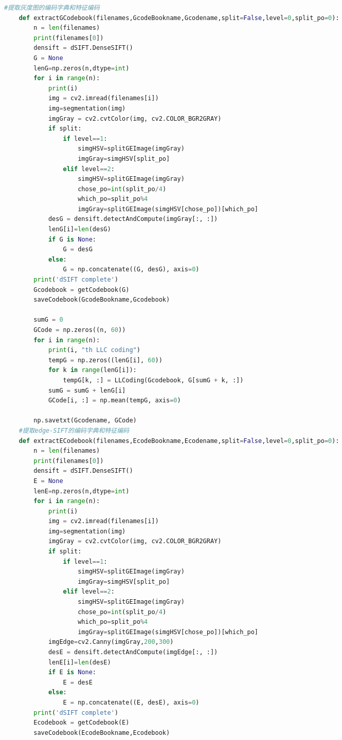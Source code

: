 \documentclass[supercite]{HustGraduPaper}
\begin{document}
\begin{sloppypar}
\begin{appendices}
\begin{spacing}{1.25}
\begin{lstlisting}[language=python]
    #提取灰度图的编码字典和特征编码
    def extractGCodebook(filenames,GcodeBookname,Gcodename,split=False,level=0,split_po=0):
        n = len(filenames)
        print(filenames[0])
        densift = dSIFT.DenseSIFT()
        G = None
        lenG=np.zeros(n,dtype=int)
        for i in range(n):
            print(i)
            img = cv2.imread(filenames[i])
            img=segmentation(img)
            imgGray = cv2.cvtColor(img, cv2.COLOR_BGR2GRAY)
            if split:
                if level==1:
                    simgHSV=splitGEImage(imgGray)
                    imgGray=simgHSV[split_po]
                elif level==2:
                    simgHSV=splitGEImage(imgGray)
                    chose_po=int(split_po/4)
                    which_po=split_po%4
                    imgGray=splitGEImage(simgHSV[chose_po])[which_po]
            desG = densift.detectAndCompute(imgGray[:, :])
            lenG[i]=len(desG)
            if G is None:
                G = desG
            else:
                G = np.concatenate((G, desG), axis=0)
        print('dSIFT complete')
        Gcodebook = getCodebook(G)
        saveCodebook(GcodeBookname,Gcodebook)
    
        sumG = 0
        GCode = np.zeros((n, 60))
        for i in range(n):
            print(i, "th LLC coding")
            tempG = np.zeros((lenG[i], 60))
            for k in range(lenG[i]):
                tempG[k, :] = LLCoding(Gcodebook, G[sumG + k, :])
            sumG = sumG + lenG[i]
            GCode[i, :] = np.mean(tempG, axis=0)
    
        np.savetxt(Gcodename, GCode)
    #提取edge-SIFT的编码字典和特征编码
    def extractECodebook(filenames,EcodeBookname,Ecodename,split=False,level=0,split_po=0):
        n = len(filenames)
        print(filenames[0])
        densift = dSIFT.DenseSIFT()
        E = None
        lenE=np.zeros(n,dtype=int)
        for i in range(n):
            print(i)
            img = cv2.imread(filenames[i])
            img=segmentation(img)
            imgGray = cv2.cvtColor(img, cv2.COLOR_BGR2GRAY)
            if split:
                if level==1:
                    simgHSV=splitGEImage(imgGray)
                    imgGray=simgHSV[split_po]
                elif level==2:
                    simgHSV=splitGEImage(imgGray)
                    chose_po=int(split_po/4)
                    which_po=split_po%4
                    imgGray=splitGEImage(simgHSV[chose_po])[which_po]
            imgEdge=cv2.Canny(imgGray,200,300)
            desE = densift.detectAndCompute(imgEdge[:, :])
            lenE[i]=len(desE)
            if E is None:
                E = desE
            else:
                E = np.concatenate((E, desE), axis=0)
        print('dSIFT complete')
        Ecodebook = getCodebook(E)
        saveCodebook(EcodeBookname,Ecodebook)
    

\end{lstlisting}
\end{spacing}
\end{appendices}
\end{sloppypar}
\end{document}
